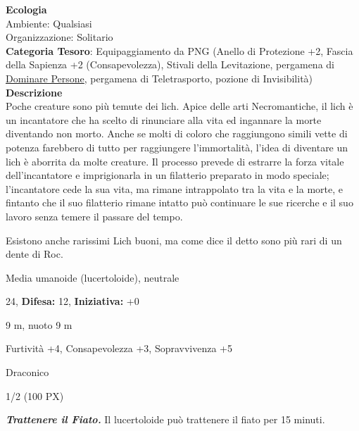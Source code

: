 \begin{multicols}{2}
{\textbf{Ecologia}\\
Ambiente: Qualsiasi\\
Organizzazione: Solitario\\
\textbf{Categoria Tesoro}: Equipaggiamento da PNG (Anello di Protezione +2, Fascia della Sapienza +2 (Consapevolezza), Stivali della Levitazione, pergamena di \hyperlink{Dominare Persone}{Dominare Persone}, pergamena di Teletrasporto, pozione di Invisibilità)\\
\textbf{Descrizione}\\
Poche creature sono più temute dei lich. Apice delle arti Necromantiche, il lich è un incantatore che ha scelto di rinunciare alla vita ed ingannare la morte diventando non morto. Anche se molti di coloro che raggiungono simili vette di potenza farebbero di tutto per raggiungere l'immortalità, l'idea di diventare un lich è aborrita da molte creature. Il processo prevede di estrarre la forza vitale dell'incantatore e imprigionarla in un filatterio preparato in modo speciale; l'incantatore cede la sua vita, ma rimane intrappolato tra la vita e la morte, e fintanto che il suo filatterio rimane intatto può continuare le sue ricerche e il suo lavoro senza temere il passare del tempo.

Esistono anche rarissimi Lich buoni, ma come dice il detto sono più rari di un dente di Roc.

\noindent
\begin{description}[noitemsep, topsep=0pt, parsep=0pt, partopsep=0pt, leftmargin=0cm, labelwidth=2.2cm]
	\item[\textbf{Taglia/Tipo:}] Media umanoide (lucertoloide), neutrale
	\item[\textbf{Caratt.:}] 
	\item[\textbf{Punti Ferita:}] 24,  \textbf{Difesa:} 12,  \textbf{Iniziativa:} +0
	\item[\textbf{Movimento:}] 9 m, nuoto 9 m
	\item[\textbf{Tiri Salvez.:}] 
	\item[\textbf{Comp.:}] Furtività +4, Consapevolezza +3, Sopravvivenza +5
	\item[\textbf{Linguaggi:}] Draconico
	\item[\textbf{Sfida:}] 1/2 (100 PX)\smallskip
\end{description}

\emph{\textbf{Trattenere il Fiato.}} Il lucertoloide può trattenere il fiato per 15 minuti.

}
\end{multicols}
